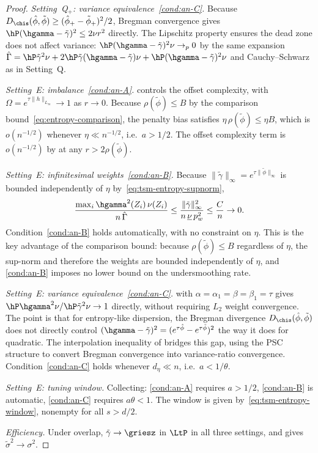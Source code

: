 \documentclass{article}
\begin{document}
\begin{proof}
\emph{Setting~Q$_+$: variance equivalence~\ref{cond:an-C}.}
Because $D_{\chis}(\hat\phi, \tilde\phi)
  \ge (\hat\phi_+ - \tilde\phi_+)^2/2$,
Bregman convergence gives
$\hP(\hgamma - \tilde\gamma)^2 \le 2\nu r^2$
directly.
The Lipschitz property ensures
the dead zone does not affect variance:
$\hP(\hgamma - \tilde\gamma)^2\nu \to_p 0$
by the same expansion
$\hat\Gamma
  = \hP\tilde\gamma^2\nu
  + 2\hP\tilde\gamma(\hgamma - \tilde\gamma)\nu
  + \hP(\hgamma - \tilde\gamma)^2\nu$
and Cauchy--Schwarz as in Setting~Q.

\emph{Setting~E: imbalance~\ref{cond:an-A}.}
controls the offset complexity,
with $\Omega = e^{\tau\|h\|_{L_\infty}} \to 1$
as $r \to 0$.
Because $\rho(\tilde\phi) \le B$
by the comparison bound~\eqref{eq:entropy-comparison},
the penalty bias satisfies
$\eta\,\rho(\tilde\phi) \le \eta B$,
which is $o(n^{-1/2})$
whenever $\eta \ll n^{-1/2}$,
i.e.\ $a > 1/2$.
The offset complexity term
is $o(n^{-1/2})$
by 
at any $r > 2\rho(\tilde\phi)$.

\emph{Setting~E: infinitesimal weights~\ref{cond:an-B}.}
Because $\|\tilde\gamma\|_\infty
  = e^{\tau\|\tilde\phi\|_\infty}$
is bounded independently of $\eta$
by~\eqref{eq:tsm-entropy-supnorm},
\[
\frac{\max_i \hgamma^2(Z_i)\,\nu(Z_i)}
     {n\,\hat\Gamma}
  \le \frac{\|\tilde\gamma\|_\infty^2}{n\,\underline\nu\,p_w^2}
  \le \frac{C}{n} \to 0.
\]
Condition~\ref{cond:an-B} holds automatically,
with no constraint on $\eta$.
This is the key advantage of the comparison bound:
because $\rho(\tilde\phi) \le B$ regardless of $\eta$,
the sup-norm and therefore the weights
are bounded independently of $\eta$,
and \ref{cond:an-B} imposes no lower bound
on the undersmoothing rate.

\emph{Setting~E: variance equivalence~\ref{cond:an-C}.}
with $\alpha = \alpha_1 = \beta = \beta_1 = \tau$ gives
$\hP\hgamma^2\nu / \hP\tilde\gamma^2\nu \to 1$
directly,
without requiring $L_2$ weight convergence.
The point is that for entropy-like dispersion,
the Bregman divergence
$D_{\chis}(\hat\phi, \tilde\phi)$
does not directly control
$(\hgamma - \tilde\gamma)^2
  = (e^{\tau\hat\phi} - e^{\tau\tilde\phi})^2$
the way it does for quadratic.
The interpolation inequality
of 
bridges this gap,
using the PSC structure
to convert Bregman convergence
into variance-ratio convergence.
Condition~\ref{cond:an-C} holds whenever $d_\eta \ll n$,
i.e.\ $a < 1/\theta$.

\emph{Setting~E: tuning window.}
Collecting:
\ref{cond:an-A} requires $a > 1/2$,
\ref{cond:an-B} is automatic,
\ref{cond:an-C} requires $a\theta < 1$.
The window is given by~\eqref{eq:tsm-entropy-window},
nonempty for all $s > d/2$.

\emph{Efficiency.}
Under overlap,
$\tilde\gamma \to \griesz$ in $\LtP$
in all three settings,
and 
gives $\tilde\sigma^2 \to \sigma^2$.
\end{proof}
\end{document}

